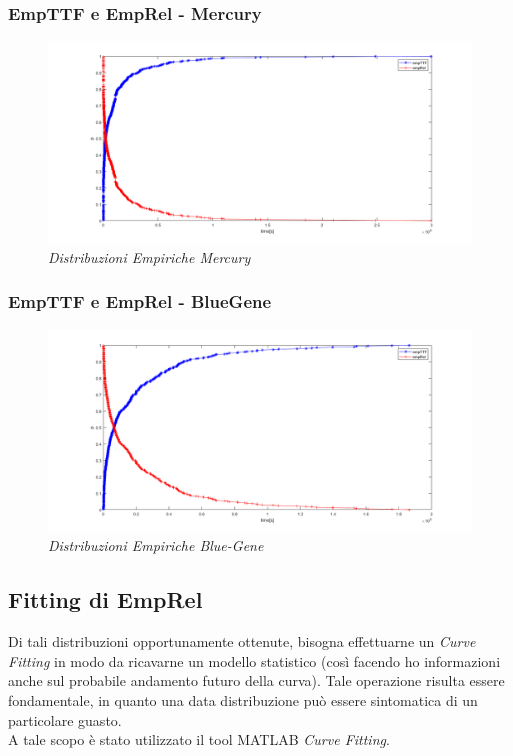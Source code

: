 \subsubsection{EmpTTF e EmpRel - Mercury}
\begin{figure}[H]
	\centering
	\includegraphics[width=\textwidth]{img/hw6/TTF_Mercury.png}
	\caption{\textit{Distribuzioni Empiriche Mercury}}
\end{figure}
\subsubsection{EmpTTF e EmpRel - BlueGene}
\begin{figure}[H]
	\centering
	\includegraphics[width=\textwidth]{img/hw6/TTF_BG.png}
	\caption{\textit{Distribuzioni Empiriche Blue-Gene}}
\end{figure}
\subsection{Fitting di EmpRel}
Di tali distribuzioni opportunamente ottenute, bisogna effettuarne un \textit{Curve Fitting} in modo da ricavarne un modello statistico (così facendo ho informazioni anche sul probabile andamento futuro della curva). Tale operazione risulta essere fondamentale, in quanto una data distribuzione può essere sintomatica di un particolare guasto.
\\A tale scopo è stato utilizzato il tool MATLAB \textit{Curve Fitting}.
